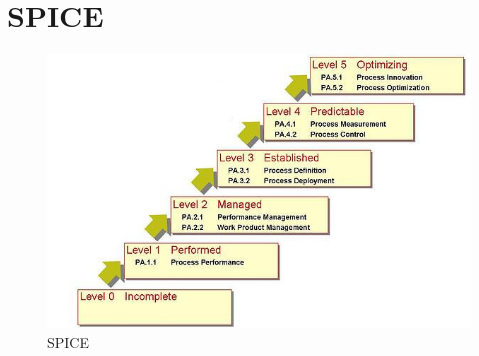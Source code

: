 \newpage
\section{SPICE}

\label{SPICE}
\begin{figure}[h]
\centering
\includegraphics[scale=1,keepaspectratio]{SPICE.jpg}
\caption{SPICE}
\end{figure}
\FloatBarrier


